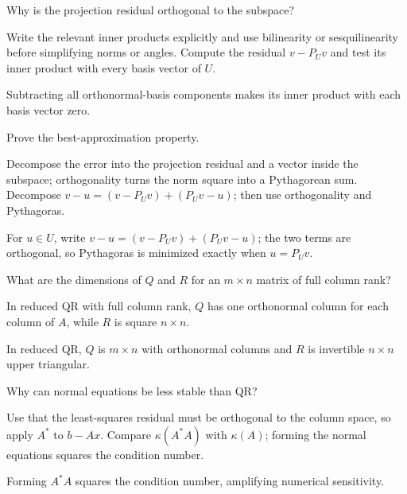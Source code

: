 \begin{exercise}\label{exr:i14-03}
Why is the projection residual orthogonal to the subspace?
\end{exercise}
\begin{hint}
Write the relevant inner products explicitly and use bilinearity or sesquilinearity before simplifying norms or angles. Compute the residual \(v-P_Uv\) and test its inner product with every basis vector of \(U\).
\end{hint}
\begin{solution}
Subtracting all orthonormal-basis components makes its inner product with each basis vector zero.
\end{solution}

\begin{exercise}\label{exr:i14-04}
Prove the best-approximation property.
\end{exercise}
\begin{hint}
Decompose the error into the projection residual and a vector inside the subspace; orthogonality turns the norm square into a Pythagorean sum. Decompose \(v-u=(v-P_Uv)+(P_Uv-u)\); then use orthogonality and Pythagoras.
\end{hint}
\begin{solution}
For $u\in U$, write $v-u=(v-P_Uv)+(P_Uv-u)$; the two terms are orthogonal, so Pythagoras is minimized exactly when $u=P_Uv$.
\end{solution}

\begin{exercise}\label{exr:i14-05}
What are the dimensions of $Q$ and $R$ for an $m\times n$ matrix of full column rank?
\end{exercise}
\begin{hint}
In reduced QR with full column rank, \(Q\) has one orthonormal column for each column of \(A\), while \(R\) is square \(n\times n\).
\end{hint}
\begin{solution}
In reduced QR, $Q$ is $m\times n$ with orthonormal columns and $R$ is invertible $n\times n$ upper triangular.
\end{solution}

\begin{exercise}\label{exr:i14-06}
Why can normal equations be less stable than QR?
\end{exercise}
\begin{hint}
Use that the least-squares residual must be orthogonal to the column space, so apply \(A^*\) to \(b-Ax\). Compare \(\kappa(A^*A)\) with \(\kappa(A)\); forming the normal equations squares the condition number.
\end{hint}
\begin{solution}
Forming $A^*A$ squares the condition number, amplifying numerical sensitivity.
\end{solution}

